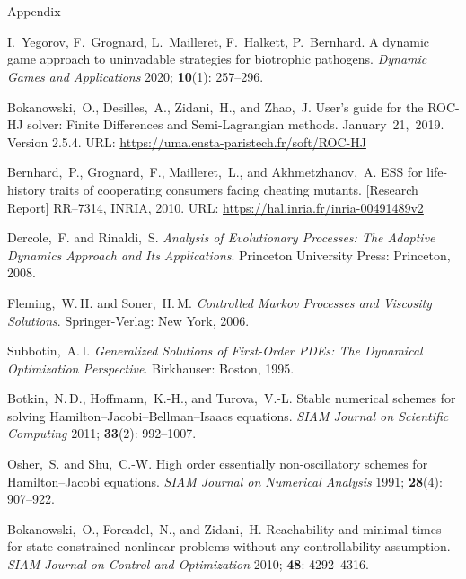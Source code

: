\documentclass[11pt]{amsart}
\begin{document}
\section{}\label{appendix:references}Appendix
\begin{thebibliography}{}

I.~Yegorov, F.~Grognard, L.~Mailleret, F.~Halkett, P.~Bernhard. A dynamic game
approach to uninvadable strategies for biotrophic
pathogens. {\it Dynamic Games and Applications} 2020; {\bf 10}(1): 257--296.

Bokanowski,~O., Desilles,~A., Zidani,~H., and Zhao,~J.
User's guide for the ROC-HJ solver: Finite Differences and Semi-Lagrangian
methods. January~21,~2019. Version 2.5.4.
URL: \url{https://uma.ensta-paristech.fr/soft/ROC-HJ}

Bernhard,~P., Grognard,~F., Mailleret,~L., and Akhmetzhanov,~A.
ESS for life-history traits of cooperating consumers facing cheating mutants.
[Research Report] RR--7314, INRIA, 2010.
URL: \url{https://hal.inria.fr/inria-00491489v2}

Dercole,~F. and Rinaldi,~S.
{\it Analysis of Evolutionary Processes{\rm :} The Adaptive Dynamics Approach
and Its Applications}.
Princeton University Press: Princeton, 2008.

Fleming,~W.\,H. and Soner,~H.\,M.
{\it Controlled Markov Processes and Viscosity Solutions}.
Springer-Verlag: New York, 2006.

Subbotin,~A.\,I.
{\it Generalized Solutions of First-Order PDEs{\rm :} The Dynamical
Optimization Perspective}.
Birkhauser: Boston, 1995.

Botkin,~N.\,D., Hoffmann,~K.-H., and Turova,~V.-L.
Stable numerical schemes for solving Hamilton--Jacobi--Bellman--Isaacs
equations.
{\it SIAM Journal on Scientific Computing} 2011; {\bf 33}(2): 992--1007.

Osher,~S. and Shu,~C.-W. High order essentially non-oscillatory schemes for
Hamilton--Jacobi equations.
{\it SIAM Journal on Numerical Analysis} 1991; {\bf 28}(4): 907--922.

Bokanowski,~O., Forcadel,~N., and Zidani,~H.
Reachability and minimal times for state constrained nonlinear problems without
any controllability assumption.
{\it SIAM Journal on Control and Optimization} 2010; {\bf 48}: 4292--4316.


\end{thebibliography}
\end{document}
